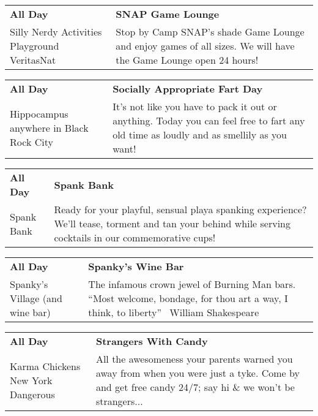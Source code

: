 \begin{tabular}{ p{1in} p{2.2in} }
    \textbf{All Day} & \textbf{SNAP Game Lounge} \\
    Silly Nerdy Activities Playground \newline VeritasNat & Stop by Camp SNAP's shade Game Lounge and enjoy games of all sizes. We will have the Game Lounge open 24 hours! \\
    \hline 
\end{tabular}
    
\begin{tabular}{ p{1in} p{2.2in} }
    \textbf{All Day} & \textbf{Socially Appropriate Fart Day} \\
    Hippocampus \newline anywhere in Black Rock City & It's not like you have to pack it out or anything. Today you can feel free to fart any old time as loudly and as smellily as you want! \\
    \hline 
\end{tabular}
    
\begin{tabular}{ p{1in} p{2.2in} }
    \textbf{All Day} & \textbf{Spank Bank} \\
    Spank Bank \newline  & Ready for your playful, sensual playa spanking experience? We'll tease, torment and tan your behind while serving cocktails in our commemorative cups! \\
    \hline 
\end{tabular}
    
\begin{tabular}{ p{1in} p{2.2in} }
    \textbf{All Day} & \textbf{Spanky's Wine Bar} \\
    Spanky's Village (and wine bar) \newline  & The infamous crown jewel of Burning Man bars.  ``Most welcome, bondage, for thou art a way, I think, to liberty''  ~William Shakespeare~ \\
    \hline 
\end{tabular}
    
\begin{tabular}{ p{1in} p{2.2in} }
    \textbf{All Day} & \textbf{Strangers With Candy} \\
    Karma Chickens \newline New York Dangerous & All the awesomeness your parents warned you away from when you were just a tyke. Come by and get free candy 24/7; say hi \& we won't be strangers... \\
    \hline 
\end{tabular}
    
